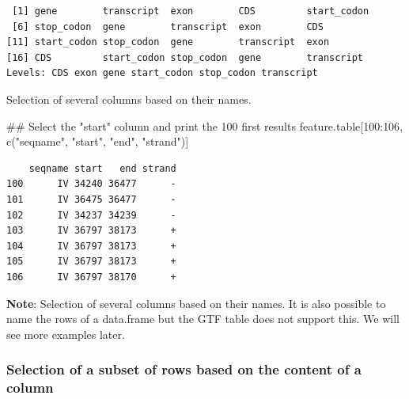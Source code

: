 \documentclass[]{article}
\newenvironment{Shaded}{\begin{snugshade}}{\end{snugshade}}
\newcommand{\KeywordTok}[1]{\textcolor[rgb]{0.94,0.87,0.69}{#1}}
\newcommand{\DataTypeTok}[1]{\textcolor[rgb]{0.87,0.87,0.75}{#1}}
\newcommand{\DecValTok}[1]{\textcolor[rgb]{0.86,0.86,0.80}{#1}}
\newcommand{\StringTok}[1]{\textcolor[rgb]{0.80,0.58,0.58}{#1}}
\newcommand{\OperatorTok}[1]{\textcolor[rgb]{0.94,0.94,0.82}{#1}}
\newcommand{\NormalTok}[1]{\textcolor[rgb]{0.80,0.80,0.80}{#1}}
\begin{document}
\begin{Shaded}
\end{Shaded}

\begin{verbatim}
 [1] gene        transcript  exon        CDS         start_codon
 [6] stop_codon  gene        transcript  exon        CDS        
[11] start_codon stop_codon  gene        transcript  exon       
[16] CDS         start_codon stop_codon  gene        transcript 
Levels: CDS exon gene start_codon stop_codon transcript
\end{verbatim}

Selection of several columns based on their names.

\begin{Shaded}
\begin{Highlighting}[]
\NormalTok{## Select the "start" column and print the 100 first results}
\NormalTok{feature.table[}\DecValTok{100}\OperatorTok{:}\DecValTok{106}\NormalTok{, }\KeywordTok{c}\NormalTok{(}\StringTok{"seqname"}\NormalTok{, }\StringTok{"start"}\NormalTok{, }\StringTok{"end"}\NormalTok{, }\StringTok{"strand"}\NormalTok{)]}
\end{Highlighting}
\end{Shaded}

\begin{verbatim}
    seqname start   end strand
100      IV 34240 36477      -
101      IV 36475 36477      -
102      IV 34237 34239      -
103      IV 36797 38173      +
104      IV 36797 38173      +
105      IV 36797 38173      +
106      IV 36797 38170      +
\end{verbatim}

\textbf{Note}: Selection of several columns based on their names. It is
also possible to name the rows of a data.frame but the GTF table does
not support this. We will see more examples later.

\subsubsection{Selection of a subset of rows based on the content of a
column}\label{selection-of-a-subset-of-rows-based-on-the-content-of-a-column}
\end{document}
